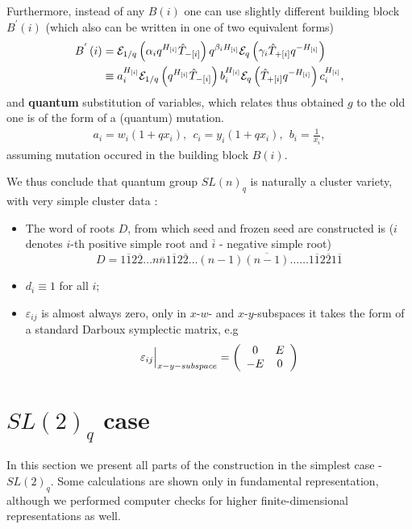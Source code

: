 \documentclass{article}
\newcommand{\lb}{\left (}
\newcommand{\rb}{\right )}
\newcommand{\be}{\begin{eqnarray}}
\newcommand{\ee}{\end{eqnarray}}
\newcommand{\ve}{\varepsilon}
\newcommand {\?}{\textit{???}}
\newcommand{\me}[0]{\mathcal{E}}
\newcommand{\hT}[0]{\hat{T}}
\newcommand{\Bp}[1]{B^{'}\lb #1 \rb}
\begin{document}
Furthermore, instead of any $B(i)$ one can use slightly different building block $\Bp{i}$
(which also can be written in one of two equivalent forms)
\begin{align}
\Bp{i} & = \me_{1/q} \lb \alpha_i q^{H_{[i]}} \hT_{-[i]} \rb q^{\beta_i H_{[i]}} \me_q \lb \gamma_i \hT_{+[i]} q^{-H_{[i]}} \rb  \\ \notag & \equiv
a_i^{H_{[i]}} \me_{1/q} \lb q^{H_{[i]}} \hT_{-[i]} \rb b_i^{H_{[i]}} \me_q \lb  \hT_{+[i]} q^{-H_{[i]}} \rb c_i^{H_{[i]}},
\end{align}
and {\bf quantum} substitution of variables, which relates thus obtained $g$ to the old one
is of the form of a (quantum) mutation.
\be
a_i = w_i(1 + q x_i), \ \ c_i = y_i(1 + q x_i), \ \ b_i = \frac{1}{x_i},
\ee 
assuming mutation occured in the building block $B(i)$.

We thus conclude that quantum group $SL(n)_q$ is naturally a cluster  variety,
with very simple cluster data \cite{FG2}:
\begin{itemize}
\item The word of roots $D$, from which seed and frozen seed are constructed is
($i$ denotes $i$-th positive simple root and $\overline{i}$ - negative simple root)
\begin{equation}
D = 1 \overline{1} 2 \overline{2} \dots n \overline{n} 1 \overline{1} 2 \overline{2} \dots (n - 1)\overline{(n-1)}
\dots \dots 1 \overline{1} 2 \overline{2} 1 \overline{1}
\end{equation}
\item $d_i \equiv 1$ for all $i$;
\item $\ve_{ij}$ is almost always zero, only in $x$-$w$- and $x$-$y$-subspaces
  it takes the form of a standard Darboux symplectic matrix, e.g
\begin{equation}
  \ve_{ij} \Big{|}_{x-y-subspace} = \lb \begin{array}{cc} 0 & E \\ -E & 0 \end{array} \rb
\end{equation}

\end{itemize}

\section {$SL(2)_q$ case}
In this section we present all parts of the construction in the simplest case - $SL(2)_q$.
Some calculations are shown only in fundamental representation, although
we performed computer checks for higher finite-dimensional representations as well.
\end{document}
